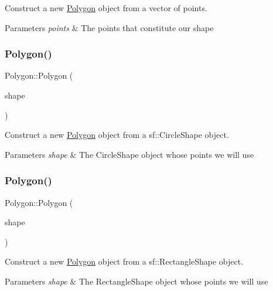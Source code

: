 Construct a new \mbox{\hyperlink{class_polygon}{Polygon}} object from a vector of points. 


\begin{DoxyParams}{Parameters}
{\em points} & The points that constitute our shape \\
\hline
\end{DoxyParams}
\mbox{\label{class_polygon_abb2febc822883a9bbc7fdfac64475539}} 
\subsubsection{\texorpdfstring{Polygon()}{Polygon()}\hspace{0.1cm}{\footnotesize\ttfamily [3/5]}}
{\footnotesize\ttfamily Polygon\+::\+Polygon (\begin{DoxyParamCaption}\item[{Circle\+Shape}]{shape }\end{DoxyParamCaption})}



Construct a new \mbox{\hyperlink{class_polygon}{Polygon}} object from a sf\+::\+Circle\+Shape object. 


\begin{DoxyParams}{Parameters}
{\em shape} & The Circle\+Shape object whose points we will use \\
\hline
\end{DoxyParams}
\mbox{\label{class_polygon_ac83748b0a87551cc4e190254303f9911}} 
\subsubsection{\texorpdfstring{Polygon()}{Polygon()}\hspace{0.1cm}{\footnotesize\ttfamily [4/5]}}
{\footnotesize\ttfamily Polygon\+::\+Polygon (\begin{DoxyParamCaption}\item[{Rectangle\+Shape}]{shape }\end{DoxyParamCaption})}



Construct a new \mbox{\hyperlink{class_polygon}{Polygon}} object from a sf\+::\+Rectangle\+Shape object. 


\begin{DoxyParams}{Parameters}
{\em shape} & The Rectangle\+Shape object whose points we will use \\
\hline
\end{DoxyParams}
\mbox{\label{class_polygon_a37104a58675193c3598c19b41f4eadda}} 
